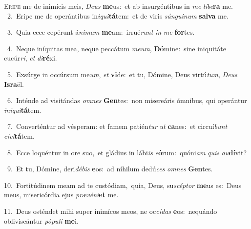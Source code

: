 \lettrine{\initial\textcolor{\initialcolor}{E}}{ripe} me de inimícis meis, \textit{De}\-\textit{us} \textbf{me}\-us:~\star et ab insurgéntibus in \textit{me} \textit{lí}\-\textit{be}\textbf{ra} me.\\
{\numbfont\textcolor{\numbcolor}{~2.}}~Eripe me de operántibus in\-\textit{i}\-\textit{qui}\textbf{tá}tem:~\star et de viris \textit{sán}\-\textit{gui}\textit{num} \textbf{sal}\-\textbf{va} me.\par
{\numbfont\textcolor{\numbcolor}{~3.}}~Quia ecce cepérunt á\-\textit{ni}\-\textit{mam} \textbf{me}\-am:~\star irrué\textit{runt} \textit{in} \textit{me} \textbf{for}\-tes.\par
{\numbfont\textcolor{\numbcolor}{~4.}}~Neque iníquitas mea, neque peccátum \textit{me}\-\textit{um}, \textbf{Dó}\-mine:~\star sine iniquitáte cucúr\-\textit{ri}\-, \textit{et} \textit{di}\-\textbf{ré}xi.\par
{\numbfont\textcolor{\numbcolor}{~5.}}~Exsúrge in occúrsum me\-\textit{um}\-, \textit{et} \textbf{vi}\-de:~\star et tu, Dómine, Deus virtú\-\textit{tum}\-, \textit{De}\-\textit{us} \textbf{Is}\-\textbf{ra}ël.\par
{\numbfont\textcolor{\numbcolor}{~6.}}~Inténde ad visitándas \textit{om}\-\textit{nes} \textbf{Gen}\-tes:~\star non misereáris ómnibus, qui operántur \textit{in}\-\textit{i}\textit{qui}\textbf{tá}tem.\par
{\numbfont\textcolor{\numbcolor}{~7.}}~Converténtur ad vésperam: et famem patién\textit{tur} \textit{ut} \textbf{ca}\-nes:~\star et circuí\textit{bunt} \textit{ci}\-\textit{vi}\textbf{tá}tem.\par
{\numbfont\textcolor{\numbcolor}{~8.}}~Ecce loquéntur in ore suo,~\dagger et gládius in lábi\textit{is} \textit{e}\-\textbf{ó}rum:~\star quóni\textit{am} \textit{quis} \textit{au}\-\textbf{dí}vit?\par
{\numbfont\textcolor{\numbcolor}{~9.}}~Et tu, Dómine, deri\-\textit{dé}\-\textit{bis} \textbf{e}\-os:~\star ad níhilum dedú\textit{ces} \textit{om}\-\textit{nes} \textbf{Gen}\-tes.\par
{\numbfont\textcolor{\numbcolor}{10.}}~Fortitúdinem meam ad te custódiam,~\dagger quia, Deus, su\-\textit{scép}\-\textit{tor} \textbf{me}\-us es:~\star Deus meus, misericórdia ejus \textit{præ}\-\textit{vé}\textit{ni}\textbf{et} me.\par
{\numbfont\textcolor{\numbcolor}{11.}}~Deus osténdet mihi super inimícos meos, ne oc\-\textit{cí}\-\textit{das} \textbf{e}\-os:~\star nequándo obliviscántur \textit{pó}\-\textit{pu}\textit{li} \textbf{me}\-i.\par
